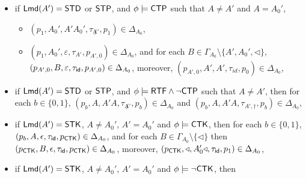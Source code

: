 {\begin{itemize}
\begin{itemize}
\begin{itemize}
                    \begin{itemize}
                        \item for each $b\in\{0,1\}$, we have $(p_b, A, A'A, \tau_{\not A'}, p_b) \in \Delta_{A_0}$, 
                        \item for each $b\in\{0,1\}$, we have $(p_b, A, \varepsilon, \tau_{A'}, p_{A',b}) \in \Delta_{A_0}$, and for each $B \in \Gamma_{A_0}\setminus\{A',A_0',\triangleleft\}$, $(p_{A',b}, B, \varepsilon, \tau_{\id}, p_{A',b}) \in \Delta_{A_0}$, moreover, $(p_{A',1},A_0',\varepsilon,\tau_{\id},p_{A',0})\in\Delta_{A_0}$, $(p_{A',b}, A', A', \tau_{id}, p_b)  \in \Delta_{A_0}$, 
                    \end{itemize}
                    \item if ${\sf Lmd}(A') = \mathsf{STD}$ or $\mathsf{STP}$, and $\phi\models {\sf CTP}$ such that $A\neq A'$ and $A = A_0'$,
                    \begin{itemize}
                        \item $(p_1, A_0', A'A_0', \tau_{\not A'}, p_1) \in \Delta_{A_0}$, 
                        \item $(p_1, A_0', \varepsilon, \tau_{A'}, p_{A',0}) \in \Delta_{A_0}$, and for each $B \in \Gamma_{A_0}\setminus\{A',A_0',\triangleleft\}$, $(p_{A',0}, B, \varepsilon, \tau_{\mathsf{id}}, p_{A',0}) \in \Delta_{A_0}$, moreover, $(p_{A',0}, A', A', \tau_{id}, p_0)  \in \Delta_{A_0}$, 
                    \end{itemize}
                    \item if ${\sf Lmd}(A') = \mathsf{STD}$ or $\mathsf{STP}$, and $\phi\models{\sf RTF}\wedge\neg{\sf CTP}$ such that $A\neq A'$,
                    then for each $b\in\{0,1\}$, $(p_b, A, A'A, \tau_{\not A'}, p_b) \in \Delta_{A_0}$ 
                    and $(p_b, A, A'A, \tau_{A', \dag}, p_b) \in \Delta_{A_0}$,
                    \item if ${\sf Lmd}(A') = \mathsf{STK}$, $A\neq A_0'$, $A' = A_0'$ and $\phi\models{\sf CTK}$, then
                    for each $b\in\{0,1\}$, $(p_b, A, \epsilon, \tau_{\mathsf{id}}, p_{{\sf CTK}})\in\Delta_{A_0}$, 
                    and for each $B\in\Gamma_{A_0}\setminus\{\triangleleft\}$ then $(p_{{\sf CTK}},B,\epsilon,\tau_{\mathsf{id}}, p_{{\sf CTK}})\in\Delta_{A_0}$, moreover, $(p_{{\sf CTK}},\triangleleft,A_0'\triangleleft,\tau_{\mathsf{id}},p_1)\in\Delta_{A_0}$,
                    \item if ${\sf Lmd}(A') = \mathsf{STK}$, $A\neq A_0'$, $A' = A_0'$ and $\phi\models\neg{\sf CTK}$, then

\end{itemize}
\end{itemize}
\end{itemize}}
